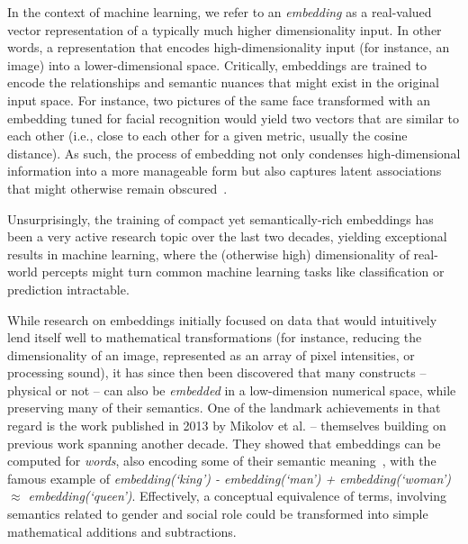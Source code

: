\begin{rewrite}

In the context of machine learning, we refer to an \emph{embedding} as a
real-valued vector representation of a typically much higher dimensionality
input. In other words, a representation that encodes high-dimensionality input
(for instance, an image) into a lower-dimensional space. Critically, embeddings
are trained to encode the relationships and semantic nuances that might exist in
the original input space. For instance, two pictures of the same face
transformed with an embedding tuned for facial recognition would yield two
vectors that are similar to each other (i.e., close to each other for a given
metric, usually the cosine distance). As such, the process of embedding not only
condenses high-dimensional information into a more manageable form but also
captures latent associations that might otherwise remain
obscured~\cite{bengio2009learning}.

Unsurprisingly, the training of compact yet semantically-rich embeddings has
been a very active research topic over the last two decades, yielding
exceptional results in machine learning, where the (otherwise high)
dimensionality of real-world percepts might turn common machine learning
tasks like classification or prediction intractable.

While research on embeddings initially focused on data that would intuitively
lend itself well to mathematical transformations (for instance, reducing the
dimensionality of an image, represented as an array of pixel intensities, or
processing sound), it has since then been discovered that many constructs --
physical or not -- can also be \emph{embedded} in a low-dimension numerical
space, while preserving many of their semantics. One of the landmark
achievements in that regard is the work published in 2013 by Mikolov et al. --
themselves building on previous work spanning another decade.  They showed that
embeddings can be computed for \emph{words}, also encoding some of their
semantic meaning~\cite{mikolov2013efficient}, with the famous example of
\emph{embedding(`king') - embedding(`man') + embedding(`woman') $\approx$
embedding(`queen')}. Effectively, a conceptual equivalence of terms, involving
semantics related to gender and social role could be transformed into simple
mathematical additions and subtractions.


\end{rewrite}
